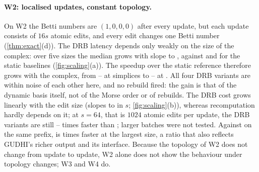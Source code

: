 \begin{table}[t]
  \centering
  \caption{Summary at one representative instance per family (three runs
    pooled). Amortised and p99 latency in ms. Static reference: the faster of
     ($^{\mathrm{i}}$) and 
    ($^{\mathrm{s}}$) on that instance. Speedup: amortised latency of the
    static reference over that of the method, over the same updates;
    $^{\circ}$: within noise. Bold p99: above the static reference beyond noise.
    W1 and W5 are discussed in \cref{sec:exp-limits}. All instances:
    Tables~\ref{S-tab:full-amort} and~\ref{S-tab:full-p99}.}
  \label{tab:summary}
  \small
  \setlength{\tabcolsep}{4.5pt}
\end{table}

\paragraph{W2: localised updates, constant topology.}
On W2 the Betti numbers are $(1,0,0,0)$ after every update, but each update
consists of $16s$ atomic edits, and every edit changes one Betti number
(\cref{thm:exact}(d)). The DRB latency depends only weakly on the size of the
complex: over five sizes the median grows with slope
\NumSlopeEOneWTwoSEightMmhmMed{} to \NumSlopeEOneWTwoSEightDrbIdMed{}, against
\NumSlopeEOneWTwoSEightFullSortedMed{} and \NumSlopeEOneWTwoSEightFullIdMed{}
for the static baselines (\cref{fig:scaling}(a)). The speedup over the static
reference therefore grows with the complex, from
\NumMainWTwoSmallestSpeedupMin--\NumMainWTwoSmallestSpeedupMax{} at
\NumWTwoNSevenSEightSize{} simplices to
\NumMainWTwoLargestSpeedupMin--\NumMainWTwoLargestSpeedupMax{} at
\NumWTwoNThirtyThreeSEightSize. All four DRB variants are within noise of each
other here, and no rebuild fired: the gain is that of the dynamic basis itself,
not of the Morse order or of rebuilds. The DRB cost grows linearly with the edit
size (slopes \NumSlopeETwoWTwoNTwentyTwoMmhmMed{} to
\NumSlopeETwoWTwoNTwentyTwoDrbIdRbMed{} in $s$; \cref{fig:scaling}(b)), whereas
recomputation hardly depends on it; at $s=64$, that is $1024$ atomic edits per
update, the DRB variants are still
\NumWTwoNTwentyTwoSSixtyFourMmhmSpeedupFullId--\NumWTwoNTwentyTwoSSixtyFourDrbIdRbSpeedupFullId{}
times faster than ; larger batches were not tested. Against
 on the same prefix,  is
\NumWTwoNThirtyThreeSEightMmhmSpeedupGudhi{} times faster at the largest size, a
ratio that also reflects GUDHI's richer output and its interface. Because the
topology of W2 does not change from update to update, W2 alone does not show the
behaviour under topology changes; W3 and W4 do.

